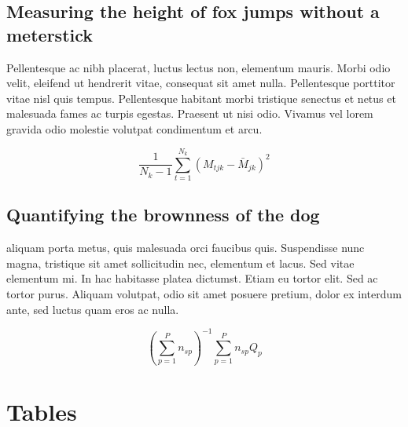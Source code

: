 \documentclass[11pt]{article}
\begin{document}
\subsection*{Measuring the height of fox jumps without a meterstick}

Pellentesque ac nibh placerat, luctus lectus non, elementum mauris. 
Morbi odio velit, eleifend ut hendrerit vitae, consequat sit amet 
nulla. Pellentesque porttitor vitae nisl quis tempus. Pellentesque 
habitant morbi tristique senectus et netus et malesuada fames ac 
turpis egestas. Praesent ut nisi odio. Vivamus vel lorem gravida 
odio molestie volutpat condimentum et arcu. 

\begin{equation}
{ \frac{1}{N_k-1} \sum \limits_{t=1}^{N_k} (M_{tjk} - \bar{M}_{jk})^2}
\end{equation}

\subsection*{Quantifying the brownness of the dog}

aliquam porta metus, quis malesuada orci faucibus quis. Suspendisse nunc 
magna, tristique sit amet sollicitudin nec, elementum et lacus. Sed 
vitae elementum mi. In hac habitasse platea dictumst. Etiam eu tortor 
elit. Sed ac tortor purus. Aliquam volutpat, odio sit amet posuere 
pretium, dolor ex interdum ante, sed luctus quam eros ac nulla. 

\begin{equation}
{ (\sum \limits_{p=1}^P {n_{sp}})^{-1}\sum \limits_{p=1}^P {n_{sp}Q_{p}}}
\end{equation}

\newpage{}






\newpage{}

\section*{Tables}
\renewcommand{\thetable}{\arabic{table}}
\setcounter{table}{0}
\end{document}
